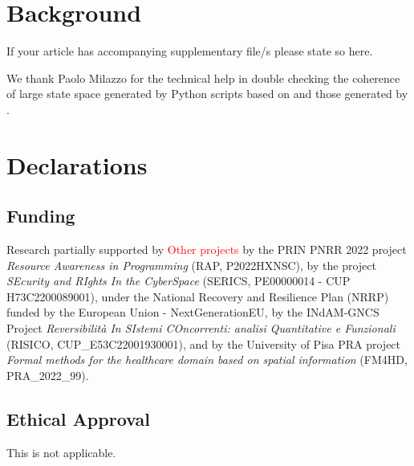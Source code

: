 \documentclass[sn-mathphys-num,a4paper,iicol,lineno,pdflatex]{sn-jnl-hacked}
\theoremstyle{thmwithspace}%
\theoremstyle{thmwithspace}%
\begin{document}


\section{Background}



















\backmatter


If your article has accompanying supplementary file/s please state so here. 

We thank Paolo Milazzo for the technical help in double checking the coherence of large state space generated by Python scripts based on \BioResolve and those generated by \GROOVE.


\section*{Declarations}

\subsection*{Funding}

Research partially supported 
by \textcolor{red}{Other projects}
by the PRIN PNRR 2022 project \emph{Resource Awareness in Programming} (RAP, P2022HXNSC),
by the project \emph{SEcurity and RIghts In the CyberSpace} (SERICS, PE00000014 - CUP H73C2200089001), under the National Recovery and Resilience Plan (NRRP) funded by the European Union - NextGenerationEU,
by the INdAM-GNCS Project \emph{Reversibilit\`a In SIstemi COncorrenti: analisi Quantitative e Funzionali} (RISICO,  CUP\_E53C22001930001),
and by the University of Pisa PRA project \emph{Formal methods for the healthcare domain based on spatial information} (FM4HD, PRA\_2022\_99).

\subsection*{Ethical Approval}
This is not applicable.
 
\end{document}
